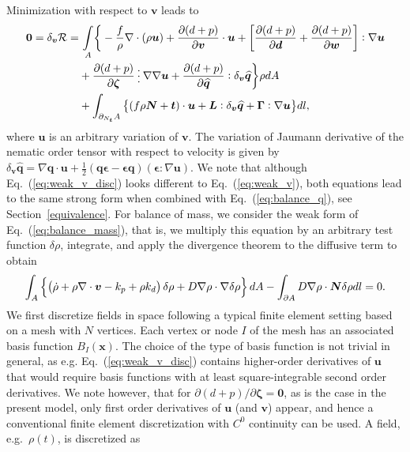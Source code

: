 Minimization with respect to $\bm{v}$ leads to 
\begin{equation}
	\label{eq:weak_v_disc}
	\begin{aligned}
		\bm{0}=\delta_{\bm{v}} \mathcal{R}=   &~\underset{ A}{\int} \bigg \{-\frac{ f}{\rho} \nabla \cdot \left(\rho\bm{u}\right) + \frac{\partial ( d+ p)}{\partial \bm{v}} \cdot\bm{u} + \left[\frac{\partial ( d+ p)}{\partial \bm{d}} + \frac{\partial ( d+ p)}{\partial \bm{w}}\right] : \nabla\bm{u}   \\ & +   
		\frac{\partial ( d+ p)}{\partial \bm{\zeta}} \cdddot \, \nabla\nabla\bm{u} + \frac{\partial ( d+ p)}{\partial \widehat{\bm{q}}} : \delta_{\bm{v}} \widehat{\bm{q}} \bigg \} \rho dA \\
		&  +   \int_{\partial_{N_{\bm{t}}} A} \big\{(f\rho \bm{N} + \bm{t}) \cdot\bm{u} +  \bm{L} : \delta_{\bm{v}} \widehat{\bm{q}}  + \bm{\Gamma}:\nabla\bm{u}  \big\}dl,
	\end{aligned}
\end{equation}
where $\bm{u}$ is an arbitrary variation of $\bm{v}$. The variation of Jaumann derivative of the nematic order tensor with respect to velocity is given by $\delta_{\bm{v}} \widehat{\bm{q}}=  \nabla\bm{q}\cdot\bm{u} + \frac{1}{2}\left(\bm{q} \bm{\epsilon} -\bm{\epsilon}\bm{q} \right) (\bm{\epsilon}:\nabla\bm{u})$. We note that although Eq.~(\ref{eq:weak_v_disc}) looks different to Eq.~(\ref{eq:weak_v}), both equations lead to the same strong form when combined with Eq.~(\ref{eq:balance_q}), see Section~\ref{equivalence}. For balance of mass, we consider the weak form of Eq.~(\ref{eq:balance_mass}), that is, we multiply this equation by an arbitrary test function $\delta\rho$, integrate, and apply the divergence theorem to the diffusive term to obtain
\begin{equation}
	\label{eq:weak_mass}
	\int_A \left \{\left( \dot{\rho}  + \rho \nabla\cdot\bm{v} - k_p  +\rho k_d\right) \delta \rho  + D\nabla \rho \cdot \nabla \delta \rho \right \} dA \nonumber\\
-  \int_{\partial A} D  \nabla \rho \cdot \bm{N} \delta \rho  dl  = 0.
\end{equation}
We first discretize fields in space following a typical finite element setting based on a mesh with $N$ vertices. Each vertex or node $I$ of the mesh has an associated basis function $B_I(\bm{x})$. The choice of the type of basis function is not trivial in general, as e.g. Eq.~(\ref{eq:weak_v_disc}) contains higher-order derivatives of $\bm{u}$ that would require basis functions with at least square-integrable second order derivatives. We note however, that for $\partial ( d+ p) / \partial \bm{\zeta} = \bm{0}$, as is the case in the present model, only first order derivatives of $\bm{u}$ (and $\bm{v}$) appear, and hence a conventional finite element discretization with $C^0$ continuity can be used. A field, e.g.~$\rho(t)$, is discretized as
